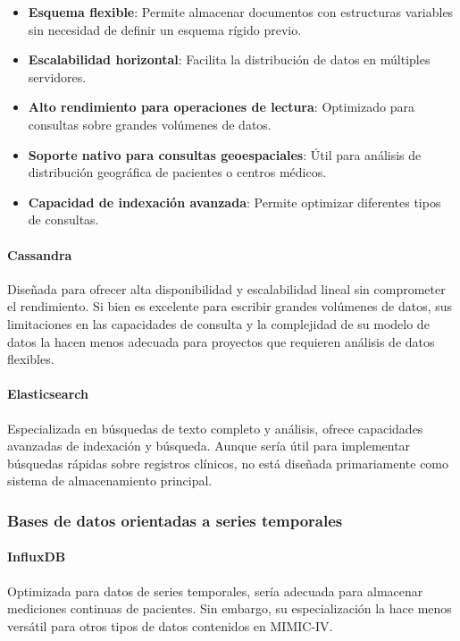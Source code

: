 \begin{itemize}
    \item \textbf{Esquema flexible}: Permite almacenar documentos con estructuras variables sin necesidad de definir un esquema rígido previo.
    \item \textbf{Escalabilidad horizontal}: Facilita la distribución de datos en múltiples servidores.
    \item \textbf{Alto rendimiento para operaciones de lectura}: Optimizado para consultas sobre grandes volúmenes de datos.
    \item \textbf{Soporte nativo para consultas geoespaciales}: Útil para análisis de distribución geográfica de pacientes o centros médicos.
    \item \textbf{Capacidad de indexación avanzada}: Permite optimizar diferentes tipos de consultas.
\end{itemize}

\paragraph{Cassandra} Diseñada para ofrecer alta disponibilidad y escalabilidad lineal sin comprometer el rendimiento. Si bien es excelente para escribir grandes volúmenes de datos, sus limitaciones en las capacidades de consulta y la complejidad de su modelo de datos la hacen menos adecuada para proyectos que requieren análisis de datos flexibles.

\paragraph{Elasticsearch} Especializada en búsquedas de texto completo y análisis, ofrece capacidades avanzadas de indexación y búsqueda. Aunque sería útil para implementar búsquedas rápidas sobre registros clínicos, no está diseñada primariamente como sistema de almacenamiento principal.

\subsubsection{Bases de datos orientadas a series temporales}

\paragraph{InfluxDB} Optimizada para datos de series temporales, sería adecuada para almacenar mediciones continuas de pacientes. Sin embargo, su especialización la hace menos versátil para otros tipos de datos contenidos en MIMIC-IV.

